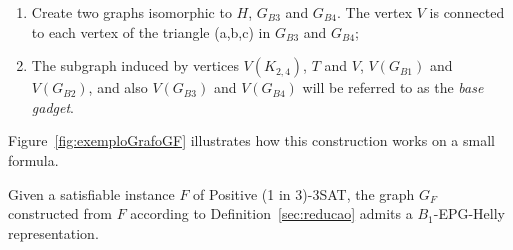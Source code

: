 \documentclass[runningheads]{llncs}
\begin{document}
\begin{definition}
\begin{enumerate}
\item Create two graphs isomorphic  to $H$, $G_{B3}$ and $G_{B4}$. The vertex $V$ is connected to each vertex of the triangle (a,b,c) in $G_{B3}$ and $G_{B4}$;

\item The  subgraph induced by vertices $V(K_{2,4})$, $T$ and $V$,  $V(G_{B1})$ and $V(G_{B2})$, and also $V(G_{B3})$ and $V(G_{B4})$ will be referred to as the  \emph{base gadget}. 
\end{enumerate}
\end{definition}


Figure~\ref{fig:exemploGrafoGF} illustrates how this construction works on a small formula. %





\begin{lemma}\label{lem:ida}
Given a satisfiable instance $F$ of {\sc Positive (1 in 3)-3SAT}, the graph $G_F$ constructed from $F$ according to Definition~\ref{sec:reducao} admits a $B_{1}$-EPG-Helly representation.
\end{lemma}





% 


% 



% 

\end{document}
